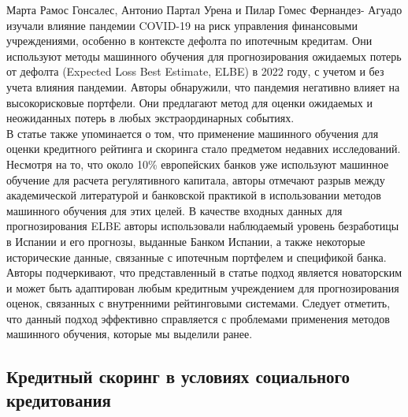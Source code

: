 \documentclass[14pt, letterpaper, twoside]{extarticle}
\begin{document}
Марта Рамос Гонсалес, Антонио Партал Урена и Пилар Гомес Фернандез-
Агуадо \cite{gonzalez2023forecasting} изучали влияние пандемии COVID-19 на риск управления финансовыми учреждениями, особенно в контексте дефолта по ипотечным кредитам. Они используют методы машинного обучения для прогнозирования ожидаемых потерь от дефолта (Expected Loss Best Estimate, ELBE) в 2022 году, с учетом и без учета влияния пандемии. Авторы обнаружили, что пандемия негативно влияет на высокорисковые портфели. Они предлагают метод для оценки ожидаемых и неожиданных потерь в любых экстраординарных событиях.\\
В статье также упоминается о том, что применение машинного обучения для оценки кредитного рейтинга и скоринга стало предметом недавних исследований. Несмотря на то, что около 10\% европейских банков уже используют машинное обучение для расчета регулятивного капитала, авторы отмечают разрыв между академической литературой и банковской практикой в использовании методов машинного обучения для этих целей. В качестве входных данных для прогнозирования ELBE авторы использовали наблюдаемый уровень безработицы в Испании и его прогнозы, выданные Банком Испании, а также некоторые исторические данные, связанные с ипотечным портфелем и спецификой банка. Авторы подчеркивают, что представленный в статье подход является новаторским и может быть адаптирован любым кредитным учреждением для прогнозирования оценок, связанных с внутренними рейтинговыми системами. Следует отметить, что данный подход эффективно справляется с проблемами применения методов машинного обучения, которые мы выделили ранее.

\subsection{Кредитный скоринг в условиях социального кредитования}
\end{document}
